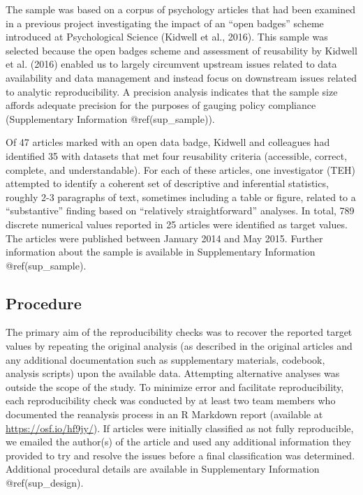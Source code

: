 \documentclass[english,,man,floatsintext]{apa6}
\begin{document}
The sample was based on a corpus of psychology articles that had been examined in a previous project investigating the impact of an \enquote{open badges} scheme introduced at Psychological Science (Kidwell et al., 2016). This sample was selected because the open badges scheme and assessment of reusability by Kidwell et al. (2016) enabled us to largely circumvent upstream issues related to data availability and data management and instead focus on downstream issues related to analytic reproducibility. A precision analysis indicates that the sample size affords adequate precision for the purposes of gauging policy compliance (Supplementary Information @ref(sup\_sample)).

Of 47 articles marked with an open data badge, Kidwell and colleagues had identified 35 with datasets that met four reusability criteria (accessible, correct, complete, and understandable). For each of these articles, one investigator (TEH) attempted to identify a coherent set of descriptive and inferential statistics, roughly 2-3 paragraphs of text, sometimes including a table or figure, related to a \enquote{substantive} finding based on \enquote{relatively straightforward} analyses. In total, 789 discrete numerical values reported in 25 articles were identified as target values. The articles were published between January 2014 and May 2015. Further information about the sample is available in Supplementary Information @ref(sup\_sample).

\hypertarget{procedure}{%
\subsection{Procedure}\label{procedure}}

The primary aim of the reproducibility checks was to recover the reported target values by repeating the original analysis (as described in the original articles and any additional documentation such as supplementary materials, codebook, analysis scripts) upon the available data. Attempting alternative analyses was outside the scope of the study. To minimize error and facilitate reproducibility, each reproducibility check was conducted by at least two team members who documented the reanalysis process in an R Markdown report (available at \url{https://osf.io/hf9jy/}). If articles were initially classified as not fully reproducible, we emailed the author(s) of the article and used any additional information they provided to try and resolve the issues before a final classification was determined. Additional procedural details are available in Supplementary Information @ref(sup\_design).
\end{document}
